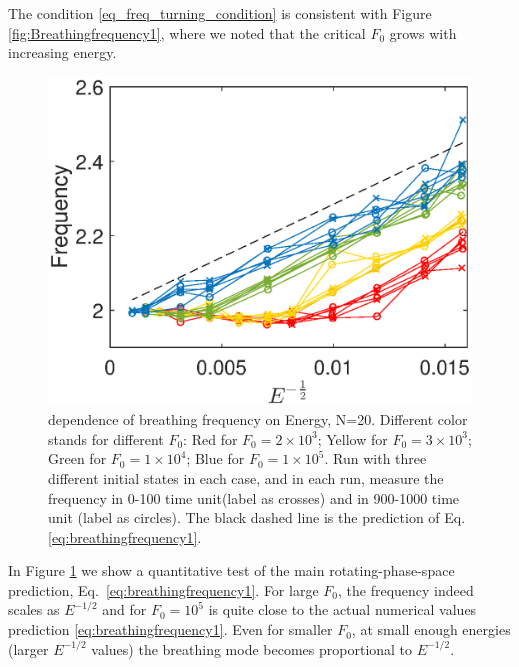\documentclass[aps,preprintnumbers,onecolumn,amsmath,amssymb,floatfix,pra]{revtex4-1}
\begin{document}
The condition \eqref{eq_freq_turning_condition} is consistent with Figure
\ref{fig:Breathingfrequency1}, where we noted that the critical $F_0$ grows with increasing energy.




\begin{figure}[h]
\centering
\includegraphics[scale=0.6]{ZhiyuPictures/freq_scanF_scanE_pre_Font18.eps}
\caption{dependence of breathing frequency on Energy, N=20. Different color stands for different $F_0$: Red for $F_0=2\times10^3$; Yellow for $F_0=3\times10^3$; Green for $F_0=1\times10^4$;  Blue for $F_0=1\times10^5$. Run with three different initial states in each case, and in each run, measure the frequency in 0-100 time unit(label as crosses) and in 900-1000 time unit (label as circles). The black dashed line is the prediction of Eq.\ref{eq:breathingfrequency1}.}
\label{fig:Breathingfrequency4}
\end{figure}


In Figure \ref{fig:Breathingfrequency4} we show a quantitative test of the main rotating-phase-space
prediction, Eq.~\eqref{eq:breathingfrequency1}.  For large $F_0$, the frequency indeed scales as
$E^{-1/2}$ and for $F_0=10^5$ is quite close to the actual numerical values prediction
\eqref{eq:breathingfrequency1}.  Even for smaller $F_0$, at small enough energies (larger $E^{-1/2}$
values) the breathing mode becomes proportional to  $E^{-1/2}$. 
\end{document}
